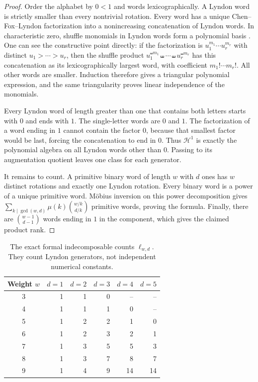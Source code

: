 \begin{proof}
Order the alphabet by \(0<1\) and words lexicographically.
A Lyndon word is strictly smaller than every nontrivial rotation.
Every word has a unique Chen--Fox--Lyndon factorization into a
nonincreasing concatenation of Lyndon words.
In characteristic zero, shuffle monomials in Lyndon words form a
polynomial basis \cite{Radford}. One can see the constructive point
directly: if the factorization is \(u_1^{m_1}\cdots u_r^{m_r}\) with
distinct \(u_1>\cdots>u_r\), then the shuffle product
\(u_1^{\shuffle m_1}\shuffle\cdots\shuffle u_r^{\shuffle m_r}\)
has this concatenation as its lexicographically largest word, with
coefficient \(m_1!\cdots m_r!\). All other words are smaller.
Induction therefore gives a triangular polynomial expression, and the
same triangularity proves linear independence of the monomials.

Every Lyndon word of length greater than one that contains both letters
starts with \(0\) and ends with \(1\). The single-letter words are
\(0\) and \(1\). The factorization of a word ending in \(1\) cannot
contain the factor \(0\), because that smallest factor would be last,
forcing the concatenation to end in \(0\).
Thus \(\mathcal H^1\) is exactly the polynomial algebra on all Lyndon
words other than \(0\). Passing to its augmentation quotient leaves
one class for each generator.

It remains to count. A primitive binary word of length \(w\) with
\(d\) ones has \(w\) distinct rotations and exactly one Lyndon rotation.
Every binary word is a power of a unique primitive word.
M\"obius inversion on this power decomposition gives
\(\sum_{k\mid\gcd(w,d)}\mu(k)\binom{w/k}{d/k}\)
primitive words, proving the formula. Finally, there are
\(\binom{w-1}{d-1}\) words ending in \(1\) in the component, which
gives the claimed product rank.
\end{proof}

\begin{table}[htbp]
\centering
\begin{tabular}{c|rrrrr}
\toprule
Weight \(w\)&\(d=1\)&\(d=2\)&\(d=3\)&\(d=4\)&\(d=5\)\\
\midrule
3&1&1&0&--&--\\
4&1&1&1&0&--\\
5&1&2&2&1&0\\
6&1&2&3&2&1\\
7&1&3&5&5&3\\
8&1&3&7&8&7\\
9&1&4&9&14&14\\
\bottomrule
\end{tabular}
\caption{The exact formal indecomposable counts \(\ell_{w,d}\).
They count Lyndon generators, not independent numerical constants.}
\label{tab:witt}
\end{table}

